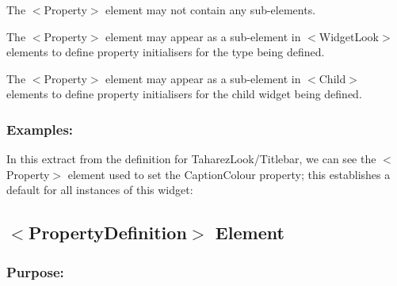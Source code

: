 \begin{DoxyItemize}
\item The {\ttfamily $<$Property$>$} element may not contain any sub-\/elements. 
\item The {\ttfamily $<$Property$>$} element may appear as a sub-\/element in {\ttfamily $<$Widget\+Look$>$} elements to define property initialisers for the type being defined. 
\item The {\ttfamily $<$Property$>$} element may appear as a sub-\/element in {\ttfamily $<$Child$>$} elements to define property initialisers for the child widget being defined. 
\end{DoxyItemize}\hypertarget{fal_element_ref_fal_elem_ref_sec_25_4}{}\subsubsection{Examples\+:}\label{fal_element_ref_fal_elem_ref_sec_25_4}
In this extract from the definition for Taharez\+Look/\+Titlebar, we can see the {\ttfamily $<$Property$>$} element used to set the \textquotesingle{}Caption\+Colour\textquotesingle{} property; this establishes a default for all instances of this widget\+: 
\begin{DoxyCode}{0}
\end{DoxyCode}
\hypertarget{fal_element_ref_fal_elem_ref_sec_26}{}\subsection{$<$\+Property\+Definition$>$ Element}\label{fal_element_ref_fal_elem_ref_sec_26}
\hypertarget{fal_element_ref_fal_elem_ref_sec_26_1}{}\subsubsection{Purpose\+:}\label{fal_element_ref_fal_elem_ref_sec_26_1}
